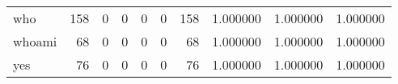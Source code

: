 \begin{longtable}{lrrrrrrrrr}
who       &                                   158 &                                                  0 &                                                  0 &                                                  0 &                                                  0 &                                                158 &                                           1.000000 &                               1.000000 &                             1.000000 \\
whoami    &                                    68 &                                                  0 &                                                  0 &                                                  0 &                                                  0 &                                                 68 &                                           1.000000 &                               1.000000 &                             1.000000 \\
yes       &                                    76 &                                                  0 &                                                  0 &                                                  0 &                                                  0 &                                                 76 &                                           1.000000 &                               1.000000 &                             1.000000 \\
\end{longtable}
